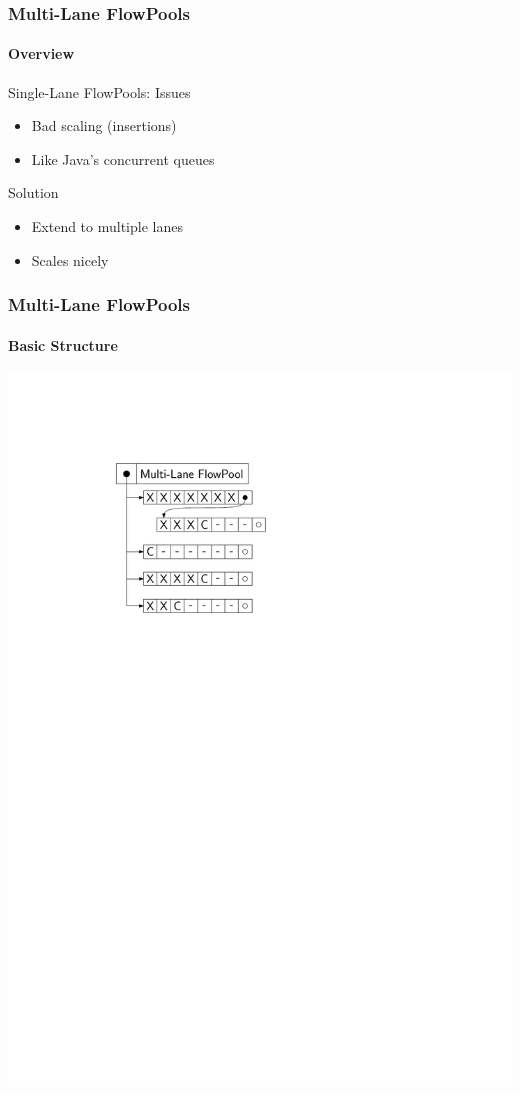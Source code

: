 \documentclass{beamer}
\begin{document}
\begin{frame}
  \frametitle{Multi-Lane FlowPools}
  \framesubtitle{Overview}

  \begin{block}{Single-Lane FlowPools: Issues}
    \begin{itemize}
    \item Bad scaling (insertions)
    \item Like Java's concurrent queues
    \end{itemize}
  \end{block}

  \begin{block}{Solution}
    \begin{itemize}
    \item Extend to multiple lanes
    \item Scales nicely
    \end{itemize}
  \end{block}

\end{frame}

\begin{frame}
  \frametitle{Multi-Lane FlowPools}
  \framesubtitle{Basic Structure}
  \begin{center}
    \includegraphics{figs/MLFP}
  \end{center}
\end{frame}
\end{document}
